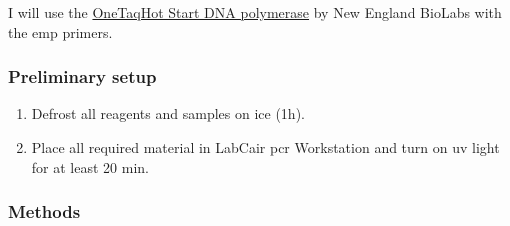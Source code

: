 I will use the \href{https://www.neb.com/products/m0481-onetaq-hot-start-dna-polymerase#Product%20Information}{OneTaq\cR Hot Start DNA polymerase} by New England BioLabs with the \gls{emp} primers.

\subsubsection{Preliminary setup}

\begin{enumerate}
\item Defrost all reagents and samples on ice (1h). 
\item Place all required material in LabCair \gls{pcr} Workstation and turn on \gls{uv} light for at least 20 min.
\end{enumerate}


\subsubsection{Methods}

